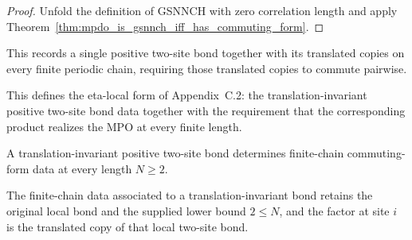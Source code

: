 \begin{proof}\leanok
    Unfold the definition of GSNNCH with zero correlation length and apply
    Theorem~\ref{thm:mpdo_is_gsnnch_iff_has_commuting_form}.
\end{proof}

\begin{definition}
    \label{def:mpdo_translation_invariant_bond_data}
    \leanok
    This records a single positive two-site bond together with its translated
    copies on every finite periodic chain, requiring those translated copies to
    commute pairwise.
\end{definition}

\begin{definition}
    \label{def:mpdo_eta_local_structure_data}
    \leanok
    This defines the eta-local form of Appendix~C.2: the
    translation-invariant positive two-site bond data together with the
    requirement that the corresponding product realizes the MPO at every finite
    length.
\end{definition}

\begin{definition}
    \label{def:mpdo_translation_invariant_bond_to_commuting_form_data}
    \leanok
    A translation-invariant positive two-site bond determines finite-chain
    commuting-form data at every length $N \ge 2$.
\end{definition}

\begin{theorem}
    \label{thm:mpdo_translation_invariant_bond_to_commuting_form_data_components}
    \leanok
    The finite-chain data associated to a translation-invariant bond retains
    the original local bond and the supplied lower bound $2 \le N$, and the
    factor at site $i$ is the translated copy of that local two-site bond.
\end{theorem}

